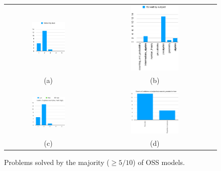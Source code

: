 \documentclass[11pt,a4paper]{article}
\begin{document}
\begin{figure}
  \begin{tabular}{cc}

    \includegraphics[width=0.4\textwidth]{oss-by-level} &
    \includegraphics[width=0.4\textwidth]{oss-by-subject} \\
    (a) & (b) \\\\

    \includegraphics[width=0.4\textwidth]{oss-surprise} &
    \includegraphics[width=0.4\textwidth]{oss-reasoning-needed} \\
    (c) & (d) \\

  \end{tabular}
  \caption{\label{fig:oss-fn-solved-analysis} Problems solved by the majority ($\ge 5/10$) of OSS models.}
\end{figure}
\end{document}
